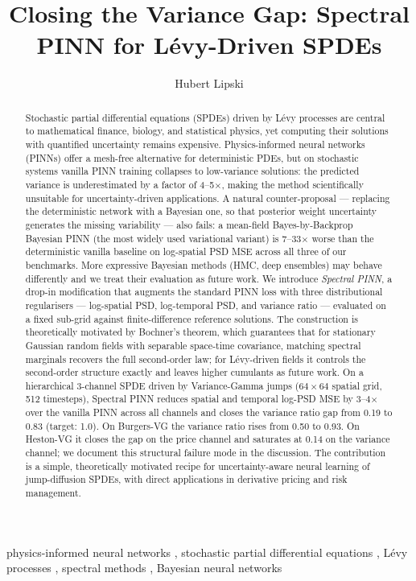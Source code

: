 \documentclass[review,12pt]{elsarticle}
\begin{document}
\begin{frontmatter}

\title{Closing the Variance Gap: Spectral PINN for L\'evy-Driven SPDEs}

\author{Hubert Lipski}

\begin{abstract}
Stochastic partial differential equations (SPDEs) driven by L\'evy
processes are central to mathematical finance, biology, and statistical
physics, yet computing their solutions with quantified uncertainty
remains expensive. Physics-informed neural networks (PINNs) offer a
mesh-free alternative for deterministic PDEs, but on stochastic systems
vanilla PINN training collapses to low-variance solutions: the
predicted variance is underestimated by a factor of 4--5\(\times\),
making the method scientifically unsuitable for uncertainty-driven
applications. A natural counter-proposal --- replacing the
deterministic network with a Bayesian one, so that posterior weight
uncertainty generates the missing variability --- also fails: a
mean-field Bayes-by-Backprop Bayesian PINN (the most widely used
variational variant) is 7--33\(\times\) worse than the deterministic
vanilla baseline on log-spatial PSD MSE across all three of our
benchmarks. More expressive Bayesian methods (HMC, deep ensembles)
may behave differently and we treat their evaluation as future work.
We introduce \emph{Spectral PINN}, a drop-in modification that augments
the standard PINN loss with three distributional regularisers ---
log-spatial PSD, log-temporal PSD, and variance ratio --- evaluated on
a fixed sub-grid against finite-difference reference solutions. The
construction is theoretically motivated by Bochner's theorem, which
guarantees that for stationary Gaussian random fields with separable
space-time covariance, matching spectral marginals recovers the full
second-order law; for L\'evy-driven fields it controls the second-order
structure exactly and leaves higher cumulants as future work. On a
hierarchical 3-channel SPDE driven by Variance-Gamma jumps
(\(64\times64\) spatial grid, 512 timesteps), Spectral PINN reduces
spatial and temporal log-PSD MSE by 3--4\(\times\) over the vanilla
PINN across all channels and closes the variance ratio gap from 0.19
to 0.83 (target: 1.0). On Burgers-VG the variance ratio rises from
0.50 to 0.93. On Heston-VG it closes the gap on the price channel
and saturates at 0.14 on the variance channel; we document this
structural failure mode in the discussion. The contribution is a
simple, theoretically motivated recipe for
uncertainty-aware neural learning of jump-diffusion SPDEs, with
direct applications in derivative pricing and risk management.
\end{abstract}

\begin{keyword}
physics-informed neural networks \sep
stochastic partial differential equations \sep
L\'evy processes \sep
spectral methods \sep
Bayesian neural networks
\end{keyword}

\end{frontmatter}
\end{document}
